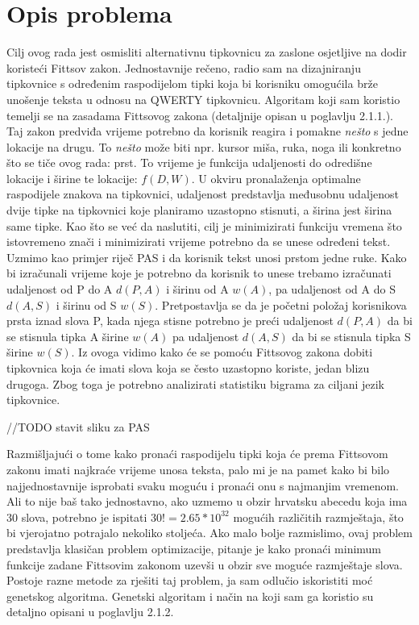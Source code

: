 \documentclass[times, utf8, zavrsni]{fer}
\begin{document}
\section{Opis problema}
Cilj ovog rada jest osmisliti alternativnu tipkovnicu za zaslone osjetljive na dodir koristeći Fittsov zakon. Jednostavnije rečeno, radio sam na dizajniranju tipkovnice s određenim raspodijelom tipki koja bi korisniku omogućila brže unošenje teksta u odnosu na QWERTY tipkovnicu. Algoritam koji sam koristio temelji se na zasadama Fittsovog zakona (detaljnije opisan u poglavlju 2.1.1.). Taj zakon predviđa vrijeme potrebno da korisnik reagira i pomakne \emph{nešto} s jedne lokacije na drugu. To \emph{nešto} može biti npr. kursor miša, ruka, noga ili konkretno što se tiče ovog rada: prst. To vrijeme je funkcija udaljenosti do odredišne lokacije i širine te lokacije: $f(D,W)$. U okviru pronalaženja optimalne raspodijele znakova na tipkovnici, udaljenost predstavlja međusobnu udaljenost dvije tipke na tipkovnici koje planiramo uzastopno stisnuti, a širina jest širina same tipke. Kao što se već da naslutiti, cilj je minimizirati funkciju vremena što istovremeno znači i minimizirati vrijeme potrebno da se unese određeni tekst. Uzmimo kao primjer riječ PAS i da korisnik tekst unosi prstom jedne ruke. Kako bi izračunali vrijeme koje je potrebno da korisnik to unese trebamo izračunati udaljenost od P do A $d(P,A)$ i širinu od A $w(A)$, pa udaljenost od A do S $d(A,S)$ i širinu od S $w(S)$. Pretpostavlja se da je početni položaj korisnikova prsta iznad slova P, kada njega stisne potrebno je preći udaljenost $d(P,A)$ da bi se stisnula tipka A širine $w(A)$ pa udaljenost $d(A,S)$ da bi se stisnula tipka S širine $w(S)$. Iz ovoga vidimo kako će se pomoću Fittsovog zakona dobiti tipkovnica koja će imati slova koja se često uzastopno koriste, jedan blizu drugoga. Zbog toga je potrebno analizirati statistiku bigrama za ciljani jezik tipkovnice.

//TODO stavit sliku za PAS

Razmišljajući o tome kako pronaći raspodijelu tipki koja će prema Fittsovom zakonu imati najkraće vrijeme unosa teksta, palo mi je na pamet kako bi bilo najjednostavnije isprobati svaku moguću i pronaći onu s najmanjim vremenom. Ali to nije baš tako jednostavno, ako uzmemo u obzir hrvatsku abecedu koja ima 30 slova, potrebno je ispitati $30! = 2.65*10^{32}$ mogućih različitih razmještaja, što bi vjerojatno potrajalo nekoliko stoljeća. Ako malo bolje razmislimo, ovaj problem predstavlja klasičan problem optimizacije, pitanje je kako pronaći minimum funkcije zadane Fittsovim zakonom uzevši u obzir sve moguće razmještaje slova. Postoje razne metode za rješiti taj problem, ja sam odlučio iskoristiti moć genetskog algoritma. Genetski algoritam i način na koji sam ga koristio su detaljno opisani u poglavlju 2.1.2.
\end{document}
